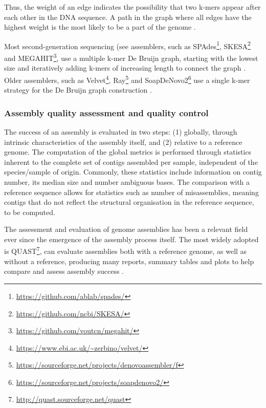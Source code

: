 Thus, the weight of an edge indicates the possibility that two k-mers appear after each other in the DNA sequence. A path in the graph where all edges have the highest weight is the most likely to be a part of the genome \citep{bayat_methods_2020}.

Most second-generation sequencing (see  assemblers, such as SPAdes\footnote{\url{https://github.com/ablab/spades/}}, SKESA\footnote{\url{https://github.com/ncbi/SKESA/}} and MEGAHIT\footnote{\url{https://github.com/voutcn/megahit/}}, use a multiple k-mer De Bruijn graph, starting with the lowest size and iteratively adding k-mers of increasing length to connect the graph \citep{bankevich_spades_2012, souvorov_skesa_2018, li_megahit_2015}. Older assemblers, such as Velvet\footnote{\url{https://www.ebi.ac.uk/~zerbino/velvet/}}, Ray\footnote{\url{https://sourceforge.net/projects/denovoassembler/f}} and SoapDeNovo2\footnote{\url{https://sourceforge.net/projects/soapdenovo2/}} use a single k-mer strategy for the De Bruijn graph construction \citep{zerbino_velvet_2008, boisvert_ray_2010, luo_soapdenovo2_2012}. 

\subsubsection{Assembly quality assessment and quality control} \label{ssec:assembly_quality}

The success of an assembly is evaluated in two steps: (1) globally, through intrinsic characteristics of the assembly itself, and (2) relative to a reference genome. The computation of the global metrics is performed through statistics inherent to the complete set of contigs assembled per sample, independent of the species/sample of origin. Commonly, these statistics include information on contig number, its median size and number ambiguous bases. The comparison with a reference sequence allows for statistics such as number of misassemblies, meaning contigs that do not reflect the structural organisation in the reference sequence, to be computed. 

The assessment and evaluation of genome assemblies has been a relevant field ever since the emergence of the assembly process itself. 
The most widely adopted is QUAST\footnote{\url{http://quast.sourceforge.net/quast}}, can evaluate assemblies both with a reference genome, as well as without a reference, producing many reports, summary tables and plots to help compare and assess assembly success \citep{gurevich_quast_2013}. 

